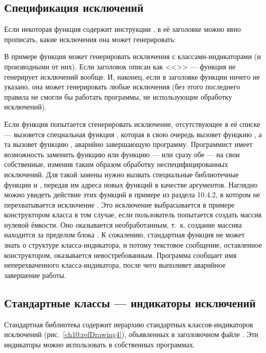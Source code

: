 \subsection[Спецификация исключений]{Спецификация исключений}
Если некоторая функция содержит инструкции , в её заголовке можно явно прописать, какие
исключения она может генерировать:


В примере функция  может генерировать исключения с классами-индикаторами
 (и производными от них). Если заголовок описан как <<>> --- функция не генерирует исключений вообще. И, наконец, если в заголовке функции ничего не указано, она может
генерировать любые исключения (без этого последнего правила не смогли бы работать программы, не использующие обработку
исключений).

Если функция попытается сгенерировать исключение, отсутствующее в её списке --- вызовется специальная функция
, которая в свою очередь вызовет фунцкию ,
а та вызовет функцию , аварийно завершающую программу. Программист имеет возможность
заменить функцию  или функцию  --- или сразу обе --- на
свои собственные, изменив таким образом обработку неспецифицированных исключений. Для такой замены нужно вызвать
специальные библиотечные функции  и ,
передав им адреса новых функций в качестве аргументов. Наглядно можно увидеть действие этих функций в примере из
раздела 10.4.2, в котором не перехватывается исключение . Это исключение
выбрасывается в примере конструктором класса  в том случае, если пользователь попытается
создать массив нулевой ёмкости. Оно оказывается необработанным, т.~к. создание массива находится за пределом блока
. К сожалению, стандартная функция не может знать о структуре класса-индикатора, и потому
текстовое сообщение, оставленное конструктором, оказывается невостребованным. Программа сообщает имя неперехваченного
класса-индикатора, после чего выполняет аварийное завершение работы.

\subsection[Стандартные классы --- индикаторы исключений]{Стандартные классы --- индикаторы исключений}
Стандартная библиотека  содержит иерархию стандартных классов-индикаторов исключений (рис.~\ref{ch10:refDrawing4}),
объявленных в заголовочном файле . Эти индикаторы можно использовать в собственных
программах.

